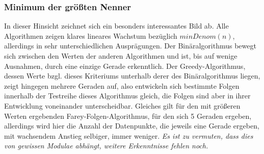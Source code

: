 \subsubsection{Minimum der größten Nenner}
In dieser Hinsicht zeichnet sich ein besonders interessantes Bild ab. Alle Algorithmen zeigen klares lineares Wachstum bezüglich $minDenom(n)$, allerdings in sehr unterschiedlichen Ausprägungen. Der Binäralgorithmus bewegt sich zwischen den Werten der anderen Algorithmen und ist, bis auf wenige Ausnahmen, durch eine einzige Gerade erkenntlich. Der Greedy-Algorithmus, dessen Werte bzgl. dieses Kriteriums unterhalb derer des Binäralgorithmus liegen, zeigt hingegen mehrere Geraden auf, also entwickeln sich bestimmte Folgen innerhalb der Testreihe dieses Algorithmus gleich, die Folgen sind aber in ihrer Entwicklung voneinander unterscheidbar. Gleiches gilt für den mit größeren Werten ergebenden Farey-Folgen-Algorithmus, für den sich 5 Geraden ergeben, allerdings wird hier die Anzahl der Datenpunkte, die jeweils eine Gerade ergeben, mit wachsendem Anstieg selbiger, immer weniger. \emph{Es ist zu vermuten, dass dies von gewissen Modulae abhängt, weitere Erkenntnisse fehlen noch.}


